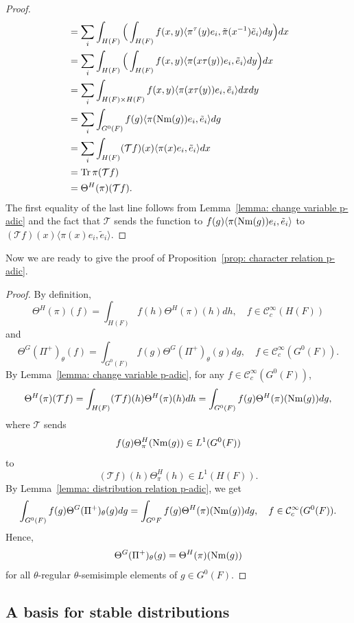 \documentclass[11pt,letterpaper]{amsart}
\numberwithin{equation}{section}
\begin{document}
\begin{proof}
\begin{align*}
& = \sum_{i} \int_{H(F)} \Big( \int_{H(F)} f(x, y) \langle \pi^{\tau}(y) e_{i}, \tilde{\pi}(x^{-1})\tilde{e}_i \rangle dy \Big) dx  \\
& = \sum_{i} \int_{H(F)} \Big( \int_{H(F)} f(x, y) \langle \pi(x\tau(y)) e_{i}, \tilde{e}_i \rangle dy \Big) dx  \\
& = \sum_{i} \int_{H(F) \times H(F)} f(x, y) \langle \pi(x\tau(y)) e_{i}, \tilde{e}_i \rangle dxdy \\
&= \sum_{i} \int_{G^{0}(F)} f(g) \langle \pi({\rm Nm}(g)) e_{i}, \tilde{e}_i \rangle dg \\
& = \sum_{i} \int_{H(F)} (\mathcal{T}f)(x) \langle \pi(x)e_{i}, \tilde{e}_i \rangle dx \\
& = {\rm Tr} \, \pi(\mathcal{T}f) \\
& = \Theta^{H}(\pi)(\mathcal{T}f) .
\end{align*}
The first equality of the last line follows from Lemma~\ref{lemma: change variable p-adic} and the fact that $\mathcal{T}$ sends the function to
\(
f(g) \langle \pi({\rm Nm}(g)) e_{i}, \tilde{e}_i \rangle
\)
to $(\mathcal{T}f)(x) \langle \pi(x)e_{i}, \tilde{e}_i \rangle$. 
\end{proof}

Now we are ready to give the proof of Proposition~\ref{prop: character relation p-adic}.

\begin{proof}
By definition,
\[
\Theta^{H}(\pi)(f) = \int_{H(F)} f(h) \Theta^{H}(\pi)(h)dh, \quad f \in \mathcal{C}^{\infty}_{c}(H(F))
\]
and
\[
\Theta^{G}(\Pi^{+})_{\theta}(f) = \int_{G^0(F)} f(g) \Theta^{G}(\Pi^{+})_{\theta}(g) dg, \quad f \in \mathcal{C}^{\infty}_{c}(G^0(F)).
\]
By Lemma~\ref{lemma: change variable p-adic}, for any $f \in \mathcal{C}^{\infty}_{c}(G^0(F))$,
\[
\Theta^{H}(\pi)(\mathcal{T}f)  = \int_{H(F)} (\mathcal{T}f)(h) \Theta^{H}(\pi)(h)dh = \int_{G^0(F)} f(g) \Theta^{H}(\pi)({\rm Nm}(g)) dg,
\]
where $\mathcal{T}$ sends 
\[
f(g)\Theta^{H}_{\pi}({\rm Nm}(g)) \in L^{1}(G^0(F))
\]
to 
\[
(\mathcal{T}f)(h) \Theta^{H}_{\pi}(h) \in L^{1}(H(F)).
\]
By Lemma~\ref{lemma: distribution relation p-adic}, we get
\[
\int_{G^0(F)} f(g) \Theta^{G}(\Pi^{+})_{\theta}(g) dg = \int_{G^0{F}} f(g) \Theta^{H}(\pi)({\rm Nm}(g)) dg, \quad f \in \mathcal{C}^{\infty}_{c}(G^0(F)).
\]
Hence, 
\[
\Theta^{G}(\Pi^{+})_{\theta}(g) = \Theta^{H}(\pi)({\rm Nm}(g))
\]
for all $\theta$-regular $\theta$-semisimple elements of $g \in G^0(F)$.
\end{proof}


\subsection{A basis for stable distributions}\label{subsection: basis of stable standards Bin}
\end{document}
